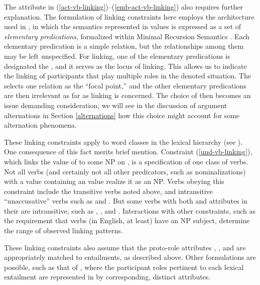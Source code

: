 \documentclass[output=paper
                ,modfonts
                ,nonflat
	        ,collection
	        ,collectionchapter
	        ,collectiontoclongg
 	        ,biblatex
                ,babelshorthands
                ,newtxmath
                ,draftmode
                ,colorlinks, citecolor=brown
]{./langsci/langscibook}
\begin{document}
The  attribute in (\ref{act-vb-linking})--(\ref{emb-act-vb-linking}) also requires further explanation.
The formulation of linking constraints here employs the architecture used in \citet{KoenigandDavis2006}, in which the semantics represented in \content values is expressed as a set of \emph{elementary predications}, formalized within Minimal Recursion Semantics \citep{Copestakeetal2001,Copestakeetal2005}.
Each elementary predication is a simple relation, but the relationships among them may be left unspecified.
For linking, one of the elementary predications is designated the , and it serves as the locus of linking.
This allows us to %
indicate the linking of participants that play multiple roles in the denoted situation. 
The  selects one relation as the ``focal point,'' and the other elementary predications are then irrelevant as far as linking is concerned. 
The choice of  then becomes an issue demanding consideration; we will see in the discussion of argument alternations  in Section \ref{alternations} how this choice might account for some alternation phenomena.

These linking constraints apply to word classes in the lexical hierarchy
 (see ).
One consequence of this fact merits brief mention.
Constraint (\ref{und-vb-linking}), which links the value of  to some NP on \argst, is a specification of one class of verbs.
Not all verbs (and certainly not all other predicators, such as nominalizations) with a \content value containing an  value realize it as an NP.
Verbs obeying this constraint include the transitive verbs noted above, and intransitive ``unaccusative'' verbs such as  and .
But some verbs with both  and  attributes in their \content are intransitive, such as , , and .
Interactions with other constraints, such as the requirement that verbs (in English, at least) have an NP subject, determine the range of observed linking patterns.

These linking constraints also assume that the proto-role  attributes , , and  are appropriately matched to entailments, as described above.
Other formulations are possible, such as that of \citet{KoenigandDavis2003}, where the participant roles  pertinent to each lexical entailment are represented in \content by corresponding, distinct attributes.
\end{document}
